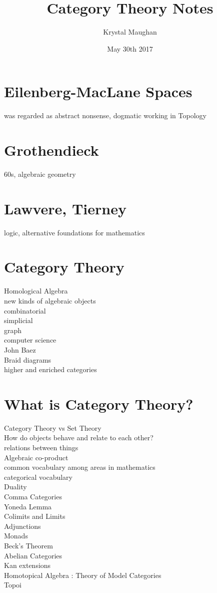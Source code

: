 \documentclass{article}
\title{Category Theory Notes}
\author{Krystal Maughan }
\date{May 30th 2017}
\begin{document}
\maketitle

\section{Eilenberg-MacLane Spaces}
was regarded as abstract nonsense, dogmatic
working in Topology
\section{Grothendieck}
60s, algebraic geometry
\section{Lawvere, Tierney}
logic, alternative foundations for mathematics
\\
\section{Category Theory}
Homological Algebra
\\
new kinds of algebraic objects
\\
combinatorial
\\
simplicial
\\
graph
\\
computer science
\\
John Baez
\\
Braid diagrams
\\
higher and enriched categories 
\\
\section{What is Category Theory?}
Category Theory vs Set Theory
\\
How do objects behave and relate to each other?
\\
relations between things
\\
Algebraic co-product
\\
common vocabulary among areas in mathematics
\\
categorical vocabulary
\\
Duality
\\
Comma Categories
\\
Yoneda Lemma
\\
Colimits and Limits
\\
Adjunctions
\\
Monads
\\
Beck's Theorem
\\
Abelian Categories
\\
Kan extensions
\\
Homotopical Algebra : Theory of Model Categories
\\
Topoi
\\
\end{document}

